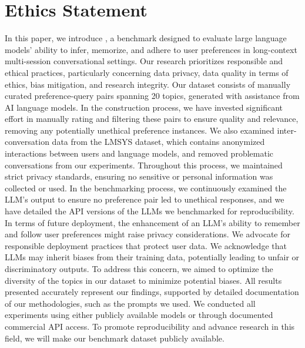 \section{Ethics Statement}
In this paper, we introduce \ours, a benchmark designed to evaluate large language models' ability to infer, memorize, and adhere to user preferences in long-context multi-session conversational settings. Our research prioritizes responsible and ethical practices, particularly concerning data privacy, data quality in terms of ethics, bias mitigation, and research integrity.
Our dataset consists of manually curated preference-query pairs spanning 20 topics, generated with assistance from AI language models. In the construction process, we have invested significant effort in manually rating and filtering these pairs to ensure quality and relevance, removing any potentially unethical preference instances. We also examined inter-conversation data from the LMSYS dataset, which contains anonymized interactions between users and language models, and removed problematic conversations from our experiments. Throughout this process, we maintained strict privacy standards, ensuring no sensitive or personal information was collected or used.
In the benchmarking process, we continuously examined the LLM's output to ensure no preference pair led to unethical responses, and we have detailed the API versions of the LLMs we benchmarked for reproducibility. In terms of future deployment, the enhancement of an LLM's ability to remember and follow user preferences might raise privacy considerations. We advocate for responsible deployment practices that protect user data.
We acknowledge that LLMs may inherit biases from their training data, potentially leading to unfair or discriminatory outputs. To address this concern, we aimed to optimize the diversity of the topics in our dataset to minimize potential biases. All results presented accurately represent our findings, supported by detailed documentation of our methodologies, such as the prompts we used. We conducted all experiments using either publicly available models or through documented commercial API access. To promote reproducibility and advance research in this field, we will make our benchmark dataset publicly available.